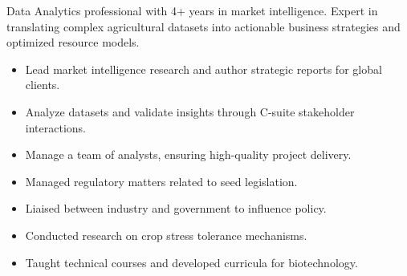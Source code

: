 \documentclass[10pt,a4paper,ragged2e]{altacv}
\begin{document}

\begin{fullwidth}
\makecvheader
\end{fullwidth}


Data Analytics professional with 4+ years in market intelligence. Expert in translating complex agricultural datasets into actionable business strategies and optimized resource models.


\begin{itemize}
\item Lead market intelligence research and author strategic reports for global clients.
\item Analyze datasets and validate insights through C-suite stakeholder interactions.
\item Manage a team of analysts, ensuring high-quality project delivery.
\end{itemize}

\divider

\begin{itemize}
\item Managed regulatory matters related to seed legislation.
\item Liaised between industry and government to influence policy.
\end{itemize}

\divider

\begin{itemize}
\item Conducted research on crop stress tolerance mechanisms.
\end{itemize}

\divider

\begin{itemize}
\item Taught technical courses and developed curricula for biotechnology.
\end{itemize}
\end{document}
